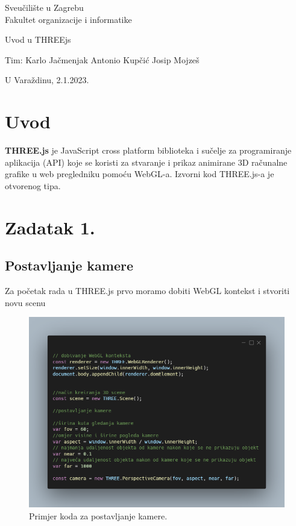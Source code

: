 \documentclass[a4paper,12pt]{article}
\begin{document}
\thispagestyle{empty}
\begin{center}
Sveučilište u Zagrebu\\
Fakultet organizacije i informatike
\end{center}
\vfill
\begin{center}
\Large Uvod u THREEjs
\end{center}
\vfill
\begin{flushright}
Tim: Karlo Jačmenjak \break
Antonio Kupčić \break
Josip Mojzeš \break
\end{flushright}
U Varaždinu, 2.1.2023. 

\newpage
\setcounter{page}{1}

\section{Uvod}

\textbf{THREE.js} je JavaScript cross platform biblioteka i sučelje za programiranje aplikacija (API) koje se koristi za stvaranje i prikaz animirane 3D računalne grafike u web pregledniku pomoću WebGL-a. Izvorni kod THREE.js-a je otvorenog tipa.

\section{Zadatak 1.}
\subsection{Postavljanje kamere}
\begin{flushleft}
    Za početak rada u THREE.js prvo moramo dobiti WebGL kontekst i stvoriti novu scenu 
\end{flushleft}


\begin{figure}[ht]
    \centering
    \includegraphics[scale=0.5]{image/zadatak1.png}
    \caption{Primjer koda za postavljanje kamere.}
\end{figure}
\end{document}
